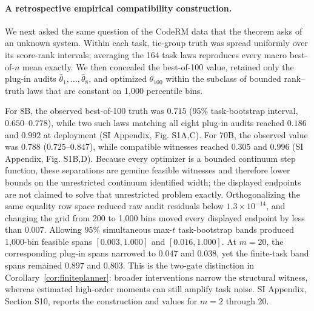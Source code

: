 \documentclass[10pt,twocolumn]{article}
\begin{document}
\paragraph{A retrospective empirical compatibility construction.}
We next asked the same question of the CodeRM data that the theorem asks of an unknown system. Within each task, tie-group truth was spread uniformly over its score-rank intervals; averaging the 164 task laws reproduces every macro best-of-$n$ mean exactly. We then concealed the best-of-100 value, retained only the plug-in audits $\widehat\theta_1,\ldots,\widehat\theta_8$, and optimized $\theta_{100}$ within the subclass of bounded rank--truth laws that are constant on 1,000 percentile bins.

For 8B, the observed best-of-100 truth was $0.715$ (95\% task-bootstrap interval, $0.650$--$0.778$), while two such laws matching all eight plug-in audits reached $0.186$ and $0.992$ at deployment (SI Appendix, Fig. S1A,C). For 70B, the observed value was $0.788$ ($0.725$--$0.847$), while compatible witnesses reached $0.305$ and $0.996$ (SI Appendix, Fig. S1B,D). Because every optimizer is a bounded continuum step function, these separations are genuine feasible witnesses and therefore lower bounds on the unrestricted continuum identified width; the displayed endpoints are not claimed to solve that unrestricted problem exactly. Orthogonalizing the same equality row space reduced raw audit residuals below $1.3\times10^{-14}$, and changing the grid from 200 to 1,000 bins moved every displayed endpoint by less than $0.007$. Allowing 95\% simultaneous max-$t$ task-bootstrap bands produced 1,000-bin feasible spans $[0.003,1.000]$ and $[0.016,1.000]$. At $m=20$, the corresponding plug-in spans narrowed to $0.047$ and $0.038$, yet the finite-task band spans remained $0.897$ and $0.803$. This is the two-gate distinction in Corollary~\ref{cor:finiteplanner}: broader interventions narrow the structural witness, whereas estimated high-order moments can still amplify task noise. SI Appendix, Section S10, reports the construction and values for $m=2$ through $20$.
\end{document}
